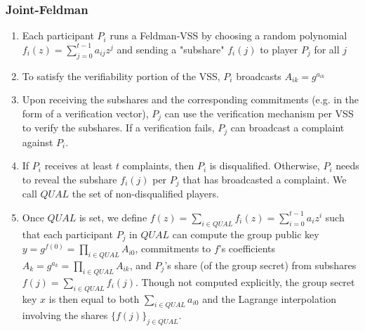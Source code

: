 \documentclass[letterpaper,twocolumn,10pt]{article}
\theoremstyle{definition}
\theoremstyle{remark}
\begin{document}
\subsubsection{Joint-Feldman}
\begin{enumerate}
\item Each participant $P_i$ runs a Feldman-VSS by choosing a random polynomial $f_i(z) = \sum_{j = 0}^{t - 1} a_{ij} z^j$ and sending a "subshare" $f_i(j)$ to player $P_j$ for all $j$
\item To satisfy the verifiability portion of the VSS, $P_i$ broadcasts $A_{ik} = g^{a_{ik}}$
\item Upon receiving the subshares and the corresponding commitments (e.g. in the form of a verification vector), $P_j$ can use the verification mechanism per VSS to verify the subshares. If a verification fails, $P_j$ can broadcast a complaint against $P_i$.
\item If $P_i$ receives at least $t$ complaints, then $P_i$ is disqualified. Otherwise, $P_i$ needs to reveal the subshare $f_i(j)$ per $P_j$ that has broadcasted a complaint. We call $QUAL$ the set of non-disqualified players.
\item Once $QUAL$ is set, we define $f(z) = \sum_{i \in QUAL} f_i(z) = \sum_{i = 0}^{t - 1} a_i z^i$ such that each participant $P_j$ in $QUAL$ can compute the group public key $y = g^{f(0)} = \prod_{i \in QUAL} A_{i0}$, commitments to $f$'s coefficients $A_k = g^{a_k} = \prod_{i \in QUAL} A_{ik}$, and $P_j$'s share (of the group secret) from subshares $f(j) = \sum_{i \in QUAL} f_i(j)$. Though not computed explicitly, the group secret key $x$ is then equal to both $\sum_{i \in QUAL} a_{i0}$ and the Lagrange interpolation involving the shares $\{f(j)\}_{j \in QUAL}$.
\end{enumerate}

\end{document}
